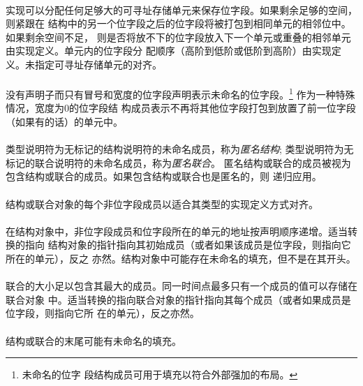 {\paragraph{}
实现可以分配任何足够大的可寻址存储单元来保存位字段。如果剩余足够的空间，则紧跟在
结构中的另一个位字段之后的位字段将被打包到相同单元的相邻位中。如果剩余空间不足，
则是否将放不下的位字段放入下一个单元或重叠的相邻单元由实现定义。单元内的位字段分
配顺序（高阶到低阶或低阶到高阶）由实现定义。未指定可寻址存储单元的对齐。

\paragraph{}
没有声明子而只有冒号和宽度的位字段声明表示未命名的位字段。\footnote{未命名的位字
段结构成员可用于填充以符合外部强加的布局。} 作为一种特殊情况，宽度为0的位字段结
构成员表示不再将其他位字段打包到放置了前一位字段（如果有的话）的单元中。

\paragraph{}
类型说明符为无标记的结构说明符的未命名成员，称为\textit{匿名结构};
类型说明符为无标记的联合说明符的未命名成员，称为\textit{匿名联合}。
匿名结构或联合的成员被视为包含结构或联合的成员。如果包含结构或联合也是匿名的，则
递归应用。

\paragraph{}
结构或联合对象的每个非位字段成员以适合其类型的实现定义方式对齐。

\paragraph{}
在结构对象中，非位字段成员和位字段所在的单元的地址按声明顺序递增。适当转换的指向
结构对象的指针指向其初始成员（或者如果该成员是位字段，则指向它所在的单元），反之
亦然。结构对象中可能存在未命名的填充，但不是在其开头。

\paragraph{}
联合的大小足以包含其最大的成员。同一时间点最多只有一个成员的值可以存储在联合对象
中。适当转换的指向联合对象的指针指向其每个成员（或者如果成员是位字段，则指向它所
在的单元），反之亦然。

\paragraph{}
结构或联合的末尾可能有未命名的填充。

}
